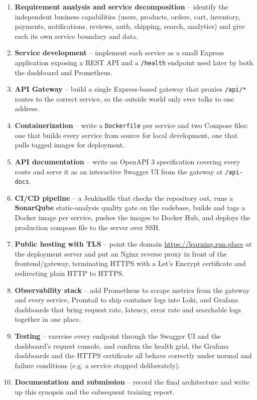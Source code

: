 \documentclass[12pt,a4paper]{article}
\begin{document}
\begin{enumerate}[label=\arabic*., itemsep=2pt, topsep=2pt]
  \item \textbf{Requirement analysis and service decomposition} -- identify the
        independent business capabilities (users, products, orders, cart,
        inventory, payments, notifications, reviews, auth, shipping, search,
        analytics) and give each its own service boundary and data.
  \item \textbf{Service development} -- implement each service as a small
        Express application exposing a REST API and a \texttt{/health}
        endpoint used later by both the dashboard and Prometheus.
  \item \textbf{API Gateway} -- build a single Express-based gateway that
        proxies \texttt{/api/*} routes to the correct service, so the outside
        world only ever talks to one address.
  \item \textbf{Containerization} -- write a \texttt{Dockerfile} per service
        and two Compose files: one that builds every service from source for
        local development, one that pulls tagged images for deployment.
  \item \textbf{API documentation} -- write an OpenAPI 3 specification
        covering every route and serve it as an interactive Swagger UI from
        the gateway at \texttt{/api-docs}.
  \item \textbf{CI/CD pipeline} -- a Jenkinsfile that checks the repository
        out, runs a \textbf{SonarQube} static-analysis quality gate on the
        codebase, builds and tags a Docker image per service, pushes the
        images to Docker Hub, and deploys the production compose file to the
        server over SSH.
  \item \textbf{Public hosting with TLS} -- point the domain
        \url{https://learning.run.place} at the deployment server and put an
        Nginx reverse proxy in front of the frontend/gateway, terminating
        HTTPS with a Let's Encrypt certificate and redirecting plain HTTP to
        HTTPS.
  \item \textbf{Observability stack} -- add Prometheus to scrape metrics from
        the gateway and every service, Promtail to ship container logs into
        Loki, and Grafana dashboards that bring request rate, latency, error
        rate and searchable logs together in one place.
  \item \textbf{Testing} -- exercise every endpoint through the Swagger UI and
        the dashboard's request console, and confirm the health grid, the
        Grafana dashboards and the HTTPS certificate all behave correctly
        under normal and failure conditions (e.g. a service stopped
        deliberately).
  \item \textbf{Documentation and submission} -- record the final
        architecture and write up this synopsis and the subsequent training
        report.
\end{enumerate}
\end{document}
